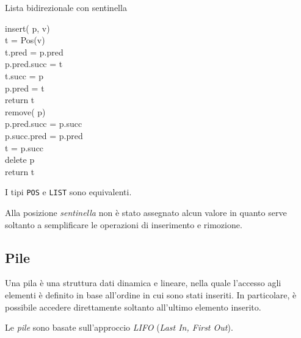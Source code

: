 \begin{code}{Lista bidirezionale con sentinella}
\begin{minipage}[t]{0.48\textwidth}
        \ind{} insert( p,  v)\\
             t = Pos(v)\\
            t.pred = p.pred\\
            p.pred.succ = t\\
            t.succ = p\\
            p.pred = t\\
            return t\\

        \ind{} remove( p)\\
            p.pred.succ = p.succ\\
            p.succ.pred = p.pred\\
             t = p.succ\\
            delete p\\
            return t
        
    \end{minipage}
\end{code}
\begin{note}
    I tipi \texttt{POS} e \texttt{LIST} sono equivalenti.
\end{note}
\begin{note}
    Alla posizione \emph{sentinella} non è stato assegnato alcun valore
    in quanto serve soltanto a semplificare le operazioni di inserimento e
    rimozione.
\end{note}

\newpage
\subsection{Pile}
\begin{definition}[Pila]
    Una pila è una struttura dati dinamica e lineare, nella quale l'accesso agli
    elementi è definito in base all'ordine in cui sono stati inseriti. In
    particolare, è possibile accedere direttamente soltanto all'ultimo elemento
    inserito.
\end{definition}
\begin{note}
    Le \emph{pile} sono basate sull'approccio \emph{LIFO} (\emph{Last In, First
    Out}).
\end{note}

